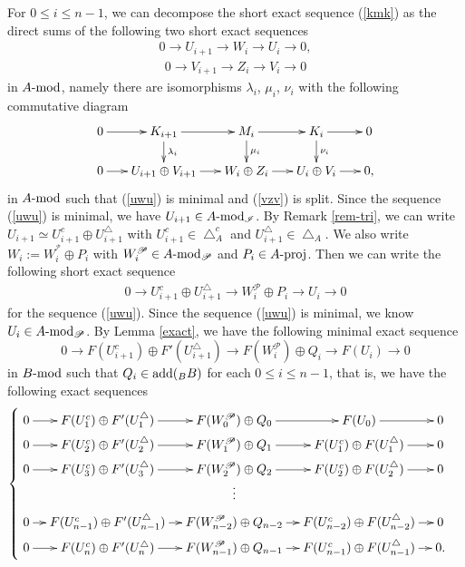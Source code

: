 \documentclass[12pt]{article}
\numberwithin{equation}{section}
\theoremstyle{definition}
\newcommand{\add}{{\rm add}}
\newcommand{\modcat}{\ensuremath{\mbox{{\rm -mod}}}}
\newcommand{\pmodcat}[1]{#1\mbox{{\rm -proj}}}
\newcommand{\lra}{\longrightarrow}
\begin{document}
For $0\le i\le n-1$, we can decompose the short exact sequence (\ref{kmk}) as the direct sums of the following two short exact sequences
\begin{align}\label{uwu}
0\lra U_{i+1}\lra W_i\lra U_i\lra 0,
\end{align}
\begin{align}\label{vzv}
0\lra V_{i+1}\lra Z_i\lra V_i\lra 0
\end{align}
in $A\modcat$, namely there are isomorphisms $\lambda_i$, $\mu_i$, $\nu_i$ with the following commutative diagram
\begin{align}\label{2row}
\xymatrix@C=0.5em@R=0.5em{
0\ar[rr]
&&K_{i+1}\ar[rr]\ar[dd]^{\lambda_i}
&&M_i\ar[rr]\ar[dd]^{\mu_i}
&&K_i\ar[rr]\ar[dd]^{\nu_i}
&&0\\
&&&&&&&&\\
0\ar[rr]
&&U_{i+1}\oplus
V_{i+1}\ar[rr]
&&W_i\oplus Z_i\ar[rr]
&&U_i\oplus V_i\ar[rr]
&&0,
}\end{align}
in $A\modcat$ such that (\ref{uwu}) is minimal and (\ref{vzv}) is split. Since the sequence (\ref{uwu}) is minimal, we have $U_{i+1}\in A\modcat_{\mathscr{I}}$.
By Remark \ref{rem-tri}, we can write $U_{i+1}\simeq U_{i+1}^{c}\oplus U_{i+1}^{\triangle}$
with $U_{i+1}^{c}\in \bigtriangleup_A^c$ and $U_{i+1}^{\triangle}\in \bigtriangleup_A$.
We also write $W_i:=W^{^{\mathscr{P}}}_i\oplus P_i$ with $W^{\mathscr{P}}_i\in A\modcat_{\mathscr{P}}$ and $P_i\in \pmodcat{A}$.
Then we can write the following short exact sequence
\begin{align}\label{uuu}
0\lra U_{i+1}^{c}\oplus U_{i+1}^{\triangle}\lra W^{\mathscr{P}}_i\oplus P_i\lra U_i\lra 0
\end{align}
for the sequence (\ref{uwu}). Since the sequence (\ref{uwu}) is minimal, we know $U_{i} \in A\modcat_{\mathscr{P}}$. By Lemma \ref{exact}, we have the following minimal exact sequence
$$ 0\lra F(U_{i+1}^{c})\oplus F'(U_{i+1}^{\triangle})\lra F(W^{\mathscr{P}}_i)\oplus Q_i\lra F(U_i)\lra 0$$
in $B\modcat$ such that $Q_i\in \add(_BB)$ for each $0\le i\le n-1$, that is, we have the following exact sequences
\begin{equation*}
\begin{cases}
\xymatrix@C=1em@R=0.1em{
0\ar[r]& F(U_{1}^{c})\oplus F'(U_{1}^{\triangle})\ar[r]& F(W^{\mathscr{P}}_0)\oplus Q_0\ar[r]& F(U_0)\ar[r] &0\\
0\ar[r]& F(U_{2}^{c})\oplus F'(U_{2}^{\triangle})\ar[r]& F(W^{\mathscr{P}}_1)\oplus Q_1\ar[r]& F(U_{1}^{c})\oplus F(U_{1}^{\triangle})\ar[r] &0\\
0\ar[r]& F(U_{3}^{c})\oplus F'(U_{3}^{\triangle})\ar[r]& F(W^{\mathscr{P}}_2)\oplus Q_2\ar[r]& F(U_{2}^{c})\oplus F(U_{2}^{\triangle})\ar[r] &0\\
&&\vdots&&\\
0\ar[r]& F(U_{n-1}^{c})\oplus F'(U_{n-1}^{\triangle})\ar[r]& F(W^{\mathscr{P}}_{n-2})\oplus Q_{n-2}\ar[r]& F(U_{n-2}^{c})\oplus F(U_{n-2}^{\triangle})\ar[r] &0\\
0\ar[r]& F(U_{n}^{c})\oplus F'(U_{n}^{\triangle})\ar[r]& F(W^{\mathscr{P}}_{n-1})\oplus Q_{n-1}\ar[r]& F(U_{n-1}^{c})\oplus F(U_{n-1}^{\triangle})\ar[r] &0.}
\end{cases}
\end{equation*}
\end{document}
